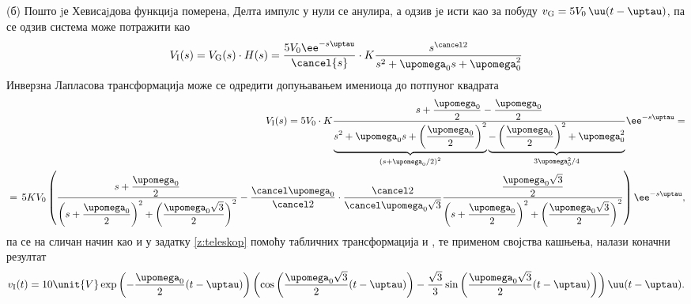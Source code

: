 (б)
Пошто jе Хевисаjдова функциjа померена, Делта импулс у нули се анулира, а одзив jе исти као за побуду
$v_{\rm G} = 5 V_0 \, \uu(t - \uptau)$, па се одзив система може потражити као 
\begin{eqnarray}
    V_{\rm I}(s) = 
    V_{\rm G}(s) \cdot H(s)
    =
    \dfrac{5 V_0 \ee^{-s\uptau}}{\cancel{s}} \cdot 
    K\dfrac{s^{\cancel2}}{s^2 + \upomega_0 s + \upomega_0^2 }
\end{eqnarray}
Инверзна Лапласова трансформација може се одредити допуњавањем имениоца до потпуног квадрата
\begin{eqnarray}
    && V_{\rm I}(s)=5 V_0 \cdot 
    K\dfrac{
        s + \dfrac{\upomega_0}{2} - \dfrac{\upomega_0}{2}
    }{
    \underbrace{s^2 + \upomega_0 s + \left(\dfrac{\upomega_0}{2}\right)^2}_{
        \left(
            s + \upomega_0/2
        \right)^2
    } 
    \underbrace{
    - \left(\dfrac{\upomega_0}{2}\right)^2  + \upomega_0^2 }_{ {3\upomega_0^2}/{4} } 
    }
    \ee^{-s\uptau} = \\
    &=& \hspace*{-2mm} 5KV_0 
        \left(
            \dfrac{
            s + \dfrac{\upomega_0}{2} 
            }{
               \left(s + \dfrac{\upomega_0}2 \right)^2 + \left( \dfrac{\upomega_0 \sqrt 3}{2} \right)^2
            }
            - \dfrac{\cancel \upomega_0}{\cancel 2}
            \cdot
            \dfrac{\cancel 2}{\cancel \upomega_0 \sqrt3}
            \dfrac{
                \dfrac{\upomega_0 \sqrt 3}{2}
            }{
                \left(s + \dfrac{\upomega_0}2 \right)^2 + \left( \dfrac{\upomega_0 \sqrt 3}{2} \right)^2
            }
    \right)
    \ee^{-s\uptau},
\end{eqnarray}
па се на сличан начин као и у задатку \ref{z:teleskop} помоћу табличних трансформација 
 и , те применом својства кашњења, налази коначни резултат 
\begin{equation}
    v_{\rm I}(t) = 
    10\unit{V}
    \exp\left(- \dfrac{\upomega_0}{2} (t-\uptau)\right)
    \left( 
        \cos\left( \dfrac{\upomega_0\sqrt3}{2}(t-\uptau) \right)
        -
        \dfrac{\sqrt 3}{3}
        \sin\left( \dfrac{\upomega_0\sqrt3}{2}(t-\uptau) \right)
    \right) \uu(t-\uptau).
\end{equation}